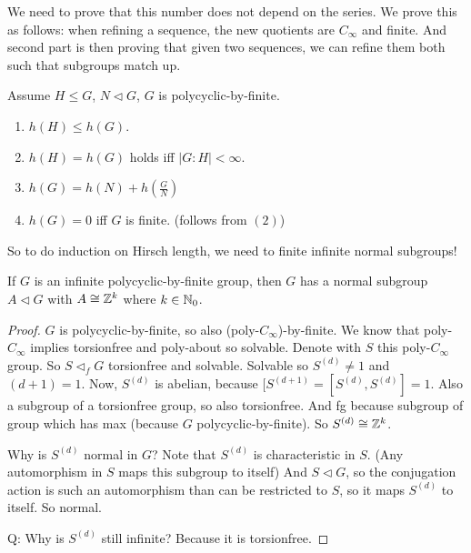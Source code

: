 We need to prove that this number does not depend on the series.
We prove this as follows: when refining a sequence, the new quotients are $C_{\infty}$ and finite.
And second part is then proving that given two sequences, we can refine them both such that subgroups match up.




\begin{prop}
    Assume $H\le G$, $N \triangleleft G$, $G$ is polycyclic-by-finite.
    \begin{enumerate}[(1)]
        \item  $h(H) \le h(G)$.
        \item $h(H) = h(G)$ holds iff $|G:H| < \infty$.
        \item $h(G) = h(N) + h(\frac{G}{N})$
        \item $h(G) = 0$ iff  $G$ is finite. (follows from $(2)$)
    \end{enumerate}
\end{prop}

So to do induction on Hirsch length, we need to finite infinite normal subgroups!

\begin{lemma}[6]
    If $G$ is an infinite polycyclic-by-finite group, then $G$ has a normal subgroup $A \triangleleft G$ with $A \cong \mathbb{Z}^{k}$ where $k \in \mathbb{N}_0$.
\end{lemma}
\begin{proof}
    $G$ is polycyclic-by-finite, so also  (poly-$C_{\infty}$)-by-finite.
    We know that poly-$C_\infty$ implies torsionfree and poly-about so solvable.
    Denote with $S$ this poly-$C_{\infty}$ group.
    So $S \triangleleft _f G$ torsionfree and solvable.
   Solvable so $S ^{(d)} \neq 1$ and $  {(d+1)} = 1$.
   Now, $S^{(d)}$ is abelian,  because $[S^{(d+1)} = [S^{(d)}, S^{(d)}] = 1$.
   Also a subgroup of a torsionfree group, so also torsionfree.
   And fg because subgroup of group which has max (because $G$ polycyclic-by-finite).
   So $S^{(d)} \cong \mathbb{Z}^{k}$.

   Why is $S^{(d)}$ normal in $G$?
   Note that $S^{(d)}$ is characteristic in $S$. (Any automorphism in $S$ maps this subgroup to itself)
   And $S \triangleleft G$, so the conjugation action is such an automorphism than can be restricted to $S$, so it maps $S^{(d)}$ to itself. So normal.

   Q: Why is $S^{(d)}$ still infinite? Because it is torsionfree.
\end{proof}

